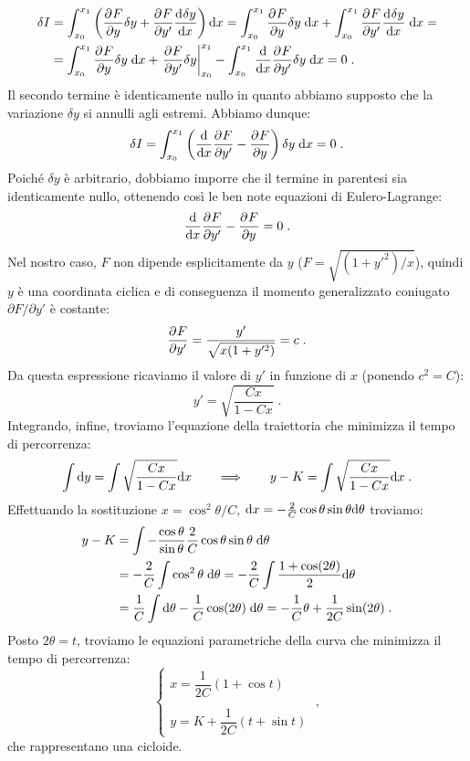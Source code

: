 \begin{align}
\delta I&= \int_{x_0}^{x_1}\left(\pdev{F}{y}\delta y+\pdev{F}{y'}\dev{\delta y}{x}\right)\diff[x]=
\int_{x_0}^{x_1} \pdev{F}{y}\delta y\;\diff[x]+\int_{x_0}^{x_1} \pdev{F}{y'}\dev{\delta y}{x}\;\diff[x]= \notag \\
&=\int_{x_0}^{x_1}\pdev{F}{y}\delta y\;\diff[x]+\left.\pdev{F}{y'}\delta y\right|_{x_0}^{x_1}-\int_{x_0}^{x_1} \frac{\diff}{\diff[x]}\pdev{F}{y'}\delta y\;\diff[x]=0\;.
\end{align}
Il secondo termine è identicamente nullo in quanto abbiamo supposto che la variazione $\delta y$ si annulli agli estremi. Abbiamo dunque:
\begin{equation}
\delta I=\int_{x_0}^{x_1} \left(\frac{\diff}{\diff[x]}\pdev{F}{y'}-\pdev{F}{y}\right)\delta y\;\diff[x]=0\;.
\end{equation}
Poiché $\delta y$ è arbitrario, dobbiamo imporre che il termine in parentesi sia identicamente nullo, ottenendo così le ben note equazioni di Eulero-Lagrange:
\begin{equation}
\frac{\diff}{\diff[x]}\pdev{F}{y'}-\pdev{F}{y}=0\;.
\end{equation}
Nel nostro caso, $F$ non dipende esplicitamente da $y$ ($F=\sqrt{(1+y'^2)/x}$), quindi $y$ è una coordinata ciclica e di conseguenza il momento generalizzato coniugato $\partial F/\partial y'$ è costante:
\begin{equation}
\pdev{F}{y'}=\frac{y'}{\sqrt{x(1+y'^2)}}=c\;.
\end{equation}
Da questa espressione ricaviamo il valore di $y'$ in funzione di $x$ (ponendo $c^2=C$):
\begin{equation}
y'=\sqrt{\frac{Cx}{1-Cx}}\;.
\end{equation}
Integrando, infine, troviamo l'equazione della traiettoria che minimizza il tempo di percorrenza:
\begin{equation}
\int \diff[y]=\int \sqrt{\frac{Cx}{1-Cx}}\diff[x]\qquad \Longrightarrow\qquad  y-K=\int \sqrt{\frac{Cx}{1-Cx}}\diff[x]\;.
\end{equation}
Effettuando la sostituzione $x=\cos^2\theta/C$, $\diff[x]=-\frac{2}{C}\cos\theta\sin\theta\diff[\theta]$ troviamo:
\begin{align}
y-K&=\int -\frac{\cos\theta}{\sin\theta}\frac{2}{C}\cos\theta\sin\theta\;\diff[\theta] \notag \\
&= -\frac{2}{C}\int \cos^2\theta\;\diff[\theta]=-\frac{2}{C}\int \frac{1+\cos(2\theta)}{2}\diff[\theta] \notag \\
&=\frac{1}{C}\int \diff[\theta]-\frac{1}{C}\cos (2\theta)\;\diff[\theta]=-\frac{1}{C}\theta+\frac{1}{2C}\sin(2\theta)\;.
\end{align}
Posto $2\theta=t$, troviamo le equazioni parametriche della curva che minimizza il tempo di percorrenza:
\begin{equation}
\begin{cases}
x=\dfrac{1}{2C}(1+\cos t) \\
\\
y=K+\dfrac{1}{2C}(t+\sin t)
\end{cases}\;,
\end{equation}
che rappresentano una cicloide.
\pagebreak
